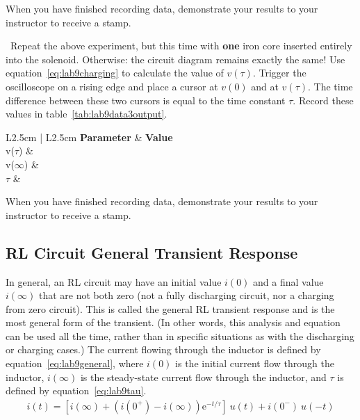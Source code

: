 When you have finished recording data, demonstrate your results to your instructor to receive a stamp.

\stampHere
\clearpage


\newCircuit~Repeat the above experiment, but this time with \textbf{one} iron core inserted entirely into the solenoid. Otherwise: the circuit diagram remains exactly the same! Use equation~\ref{eq:lab9charging} to calculate the value of $v(\tau)$. Trigger the oscilloscope on a rising edge and place a cursor at $v(0)$ and at $v(\tau)$. The time difference between these two cursors is equal to the time constant $\tau$. Record these values in table~\ref{tab:lab9data3output}.

\begin{table}[!ht]
	\niceTable
	\begin{tabular} {L{2.5cm} | L{2.5cm} }
		\textbf{Parameter} 	& \textbf{Value}	\\
		\hline
		v($\tau$)			&			\\
		\hline
		v($\infty$)			&			\\
		\hline
		$\tau$			&			\\
		\hline
	\end{tabular}
	\caption{Circuit 3 output values.}
	\label{tab:lab9data3output}
\end{table}

When you have finished recording data, demonstrate your results to your instructor to receive a stamp.

\stampHere
\lineSep


\subsection{RL Circuit General Transient Response}

In general, an RL circuit may have an initial value $i(0)$ and a final value $i(\infty)$ that are not both zero (not a fully discharging circuit, nor a charging from zero circuit). This is called the general RL transient response and is the most general form of the transient. (In other words, this analysis and equation can be used all the time, rather than in specific situations as with the discharging or charging cases.) The current flowing through the inductor is defined by equation~\ref{eq:lab9general}, where $i(0)$ is the initial current flow through the inductor, $i(\infty)$ is the steady-state current flow through the inductor, and $\tau$ is defined by equation~\ref{eq:lab9tau}.
\begin{gather}
	i(t) = \left[i(\infty) + (i(0^+) - i(\infty)) \textrm{e}^{-t/\tau}\right]~u(t) + i(0^-)~u(-t)
	\label{eq:lab9general}
\end{gather}

